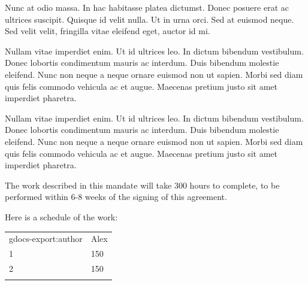 Nunc at odio massa. In hac habitasse platea dictumst. Donec posuere erat ac ultrices suscipit. Quisque id velit nulla. Ut in urna orci. Sed at euismod neque. Sed velit velit, fringilla vitae eleifend eget, auctor id mi.

Nullam vitae imperdiet enim. Ut id ultrices leo. In dictum bibendum vestibulum. Donec lobortis condimentum mauris ac interdum. Duis bibendum molestie eleifend. Nunc non neque a neque ornare euismod non ut sapien. Morbi sed diam quis felis commodo vehicula ac et augue. Maecenas pretium justo sit amet imperdiet pharetra.

Nullam vitae imperdiet enim. Ut id ultrices leo. In dictum bibendum vestibulum. Donec lobortis condimentum mauris ac interdum. Duis bibendum molestie eleifend. Nunc non neque a neque ornare euismod non ut sapien. Morbi sed diam quis felis commodo vehicula ac et augue. Maecenas pretium justo sit amet imperdiet pharetra.

\pagebreak


The work described in this mandate will take 300 hours to complete, to be performed within 6-8 weeks of the signing of this agreement.


Here is a schedule of the work:

\hyperref[]{}\hyperref[]{}

\begin{longtable}[c]{@{}ll@{}}
\toprule\addlinespace
\begin{minipage}[t]{0.47\columnwidth}\raggedright
gdocs-export:author
\end{minipage} & \begin{minipage}[t]{0.47\columnwidth}\raggedright
Alex
\end{minipage}
\\\addlinespace
\begin{minipage}[t]{0.47\columnwidth}\raggedright
1
\end{minipage} & \begin{minipage}[t]{0.47\columnwidth}\raggedright
150
\end{minipage}
\\\addlinespace
\begin{minipage}[t]{0.47\columnwidth}\raggedright
2
\end{minipage} & \begin{minipage}[t]{0.47\columnwidth}\raggedright
150
\end{minipage}
\\\addlinespace
\bottomrule
\end{longtable}

